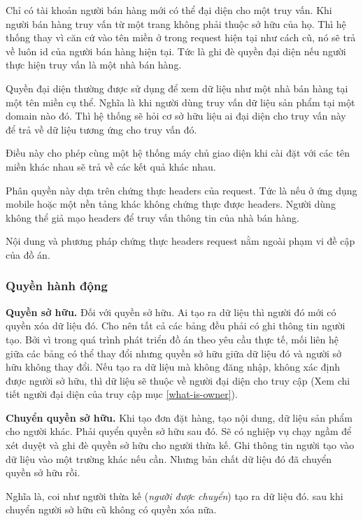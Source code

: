 Chỉ có tài khoản người bán hàng mới có thể đại diện cho một truy vấn. Khi người bán hàng truy vấn từ một trang không phải thuộc sở hữu của họ. Thì hệ thống thay vì căn cứ vào tên miền ở trong \gls{request} hiện tại như cách cũ, nó sẽ trả về luôn \gls{id} của người bán hàng hiện tại. Tức là ghi đè quyền đại diện nếu người thực hiện truy vấn là một nhà bán hàng.

Quyền đại diện thường được sử dụng để xem dữ liệu như một nhà bán hàng tại một tên miền cụ thể. Nghĩa là khi người dùng truy vấn dữ liệu sản phẩm tại một domain nào đó. Thì hệ thống sẽ hỏi cơ sở hữu liệu ai đại diện cho truy vấn này để trả về dữ liệu tương ứng cho truy vấn đó.

Điều này cho phép cùng một hệ thống máy chủ giao diện khi cài đặt với các tên miền khác nhau sẽ trả về các kết quả khác nhau.

Phân quyền này dựa trên chứng thực \gls{headers} của \gls{request}. Tức là nếu ở ứng dụng \gls{mobile} hoặc một nền tảng khác không chứng thực được \gls{headers}. Người dùng không thể giả mạo \gls{headers} để truy vấn thông tin của nhà bán hàng.

Nội dung và phương pháp chứng thực \gls{headers} \gls{request} nằm ngoài phạm vi đề cập của đồ án.

\subsubsection{Quyền hành động}

\textbf{Quyền sở hữu.} Đối với quyền sở hữu. Ai tạo ra dữ liệu thì người đó mới có quyền xóa dữ liệu đó. Cho nên tất cả các bảng đều phải có ghi thông tin người tạo. Bởi vì trong quá trình phát triển đồ án theo yêu cầu thực tế, mối liên hệ giữa các bảng có thể thay đổi nhưng quyền sở hữu giữa dữ liệu đó và người sở hữu không thay đổi. Nếu tạo ra dữ liệu mà không đăng nhập, không xác định được người sở hữu, thì dữ liệu sẽ thuộc về người đại diện cho truy cập (Xem chi tiết người đại diện của truy cập mục \ref{what-is-owner}).

\textbf{Chuyển quyền sở hữu.} Khi tạo đơn đặt hàng, tạo nội dung, dữ liệu sản phẩm cho người khác. Phải quyển quyền sở hữu sau đó. Sẽ có nghiệp vụ chạy ngầm để xét duyệt và ghi đè quyền sở hữu cho người thừa kế. Ghi thông tin người tạo vào dữ liệu vào một trường khác nếu cần. Nhưng bản chất dữ liệu đó đã chuyển quyền sở hữu rồi.

Nghĩa là, coi như người thừa kế (\emph{người được chuyển}) tạo ra dữ liệu đó. sau khi chuyển người sở hữu cũ không có quyền xóa nữa.

